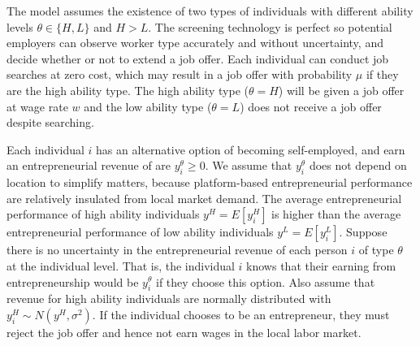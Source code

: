 \documentclass[letterpaper,12pt]{article}
\begin{document}



The model assumes the existence of two types of individuals with different ability levels $\theta\in\{H,L\}$ and $H>L$. The screening technology is perfect so potential employers can observe worker type accurately and without uncertainty, and decide whether or not to extend a job offer. Each individual can conduct job searches at zero cost, which may result in a job offer with probability $\mu$ if they are the high ability type. The high ability type ($\theta=H$) will be given a job offer at wage rate $w$ and the low ability type ($\theta=L$) does not receive a job offer despite searching. 


Each individual $i$ has an alternative option of becoming self-employed, and earn an entrepreneurial revenue of are $y^{\theta}_{i}\geq 0$. We assume that $y^{\theta}_{i}$ does not depend on location to simplify matters, because platform-based entrepreneurial performance are relatively insulated from local market demand. The average entrepreneurial performance of high ability individuals $y^{H}=E[y^{H}_{i}]$ is higher than the average entrepreneurial performance of low ability individuals $y^{L}=E[y^{L}_{i}]$. Suppose there is no uncertainty in the entrepreneurial revenue of each person $i$ of type $\theta$ at the individual level. That is, the individual $i$ knows that their earning from entrepreneurship would be $y^{\theta}_{i}$ if they choose this option. Also assume that revenue for high ability individuals are normally distributed with $y^{H}_{i}\sim N(y^{H},\sigma^{2})$. If the individual chooses to be an entrepreneur, they must reject the job offer and hence not earn wages in the local labor market.
\end{document}
